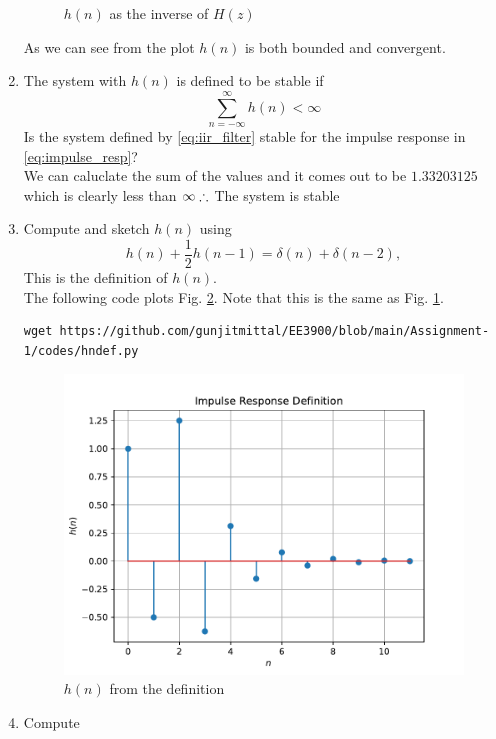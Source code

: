 \documentclass[journal,12pt,twocolumn]{IEEEtran}
\renewcommand\thesection{\arabic{section}}
\begin{document}
\begin{enumerate}[label=\thesection.\arabic*]
\begin{figure}[!ht]
\caption{$h(n)$ as the inverse of $H(z)$}
\label{fig:hn}
\end{figure}
As we can see from the plot $h(n)$ is both bounded and convergent.
\item The system with $h(n)$ is defined to be stable if
\begin{equation}
\sum_{n=-\infty}^{\infty}h(n) < \infty
\end{equation}
Is the system defined by \eqref{eq:iir_filter} stable for the impulse response in \eqref{eq:impulse_resp}?\\
\solution We can caluclate the sum of the values and it comes out to be $1.33203125$ which is clearly less than $\infty\\ \therefore$ The system is stable
\item 
Compute and sketch $h(n)$ using 
\begin{equation}
\label{eq:iir_filter_h}
h(n) + \frac{1}{2}h(n-1) = \delta(n) + \delta(n-2), 
\end{equation}
%
This is the definition of $h(n)$.
\\
\solution The following code plots Fig. \ref{fig:hndef}. Note that this is the same as Fig. 
\ref{fig:hn}. 
%
\begin{lstlisting}
wget https://github.com/gunjitmittal/EE3900/blob/main/Assignment-1/codes/hndef.py
\end{lstlisting}
\begin{figure}[!ht]
\centering
\includegraphics[width=\columnwidth]{./figs/hndef}
\caption{$h(n)$ from the definition}
\label{fig:hndef}
\end{figure}
%
\item Compute 

\end{enumerate}
\end{document}

